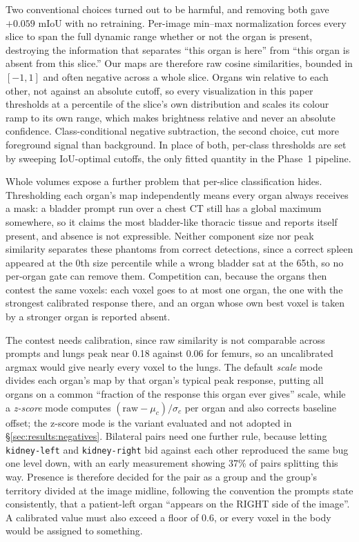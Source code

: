 \documentclass[10pt]{article}
\newcommand{\org}[1]{\texttt{#1}}
\begin{document}
Two conventional choices turned out to be harmful, and removing both gave $+0.059$
mIoU with no retraining. Per-image min--max normalization forces every slice to
span the full dynamic range whether or not the organ is present, destroying the
information that separates ``this organ is here'' from ``this organ is absent from
this slice.'' Our maps are therefore raw cosine similarities, bounded in $[-1,1]$
and often negative across a whole slice. Organs win relative to each other, not
against an absolute cutoff, so every visualization in this paper thresholds at a
percentile of the slice's own distribution and scales its colour ramp to its own
range, which makes brightness relative and never an absolute confidence.
Class-conditional
negative subtraction, the second choice, cut more foreground signal than
background. In place of both, per-class thresholds are set by sweeping IoU-optimal
cutoffs, the only fitted quantity in the Phase~1 pipeline.

Whole volumes expose a further problem that per-slice classification hides.
Thresholding each organ's map independently means every organ always receives a
mask: a bladder prompt run over a chest CT still has a global maximum somewhere,
so it claims the most bladder-like thoracic tissue and reports itself present, and
absence is not expressible. Neither component size nor peak similarity separates
these phantoms from correct detections, since a correct spleen appeared at the 0th
size percentile while a wrong bladder sat at the 65th, so no per-organ gate can
remove them. Competition can, because
the organs then contest the same voxels: each voxel goes to at most one organ, the
one with the strongest calibrated response there, and an organ whose own best
voxel is taken by a stronger organ is reported absent.

The contest needs calibration, since raw similarity is not comparable across
prompts and lungs peak near 0.18 against 0.06 for femurs, so an uncalibrated
argmax would give nearly every voxel to the lungs. The default \emph{scale} mode
divides each organ's map by that organ's typical peak response, putting all organs
on a common ``fraction of the response this organ ever gives'' scale, while a
\emph{z-score} mode computes $(\text{raw}-\mu_c)/\sigma_c$ per organ and also
corrects baseline offset; the z-score mode is the variant evaluated and not
adopted in \S\ref{sec:results:negatives}. Bilateral pairs need one further rule,
because letting \org{kidney-left} and \org{kidney-right} bid against each other
reproduced the same bug one level down, with an early measurement showing 37\% of
pairs splitting this way. Presence is therefore decided for the pair as a group
and the group's territory divided at the image midline, following the convention
the prompts state consistently, that a patient-left organ ``appears on the RIGHT
side of the image''. A calibrated value must also exceed a floor of 0.6, or every
voxel in the body would be assigned to something.
\end{document}
